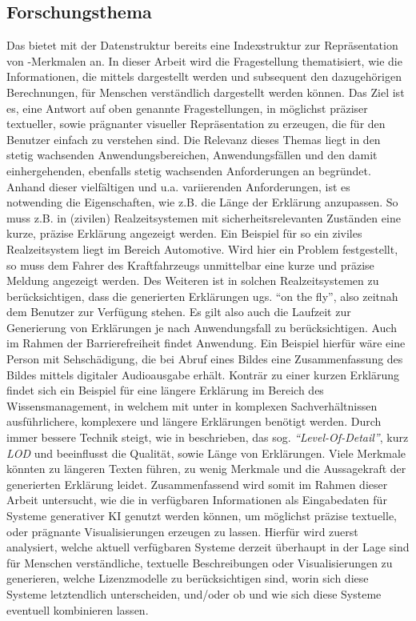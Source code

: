 \subsection{Forschungsthema}
\label{sec1:intro:subsec:res-topic}
Das \gmaf{} bietet mit der Datenstruktur \gcs{} bereits eine Indexstruktur zur Repräsentation von \mmir{}-Merkmalen an. 
In dieser Arbeit wird die Fragestellung thematisiert, wie die Informationen, die mittels \gcs{} dargestellt werden und subsequent den dazugehörigen Berechnungen, für Menschen verständlich dargestellt werden können.
Das Ziel ist es, eine Antwort auf oben genannte Fragestellungen, in möglichst präziser textueller, sowie prägnanter visueller Repräsentation zu erzeugen, die für den Benutzer einfach zu verstehen sind. 
Die Relevanz dieses Themas liegt in den stetig wachsenden Anwendungsbereichen, Anwendungsfällen und den damit einhergehenden, ebenfalls stetig wachsenden Anforderungen an \smmir{} begründet. 
Anhand dieser vielfältigen und u.a. variierenden Anforderungen, ist es notwending die Eigenschaften, wie z.B. die Länge der Erklärung anzupassen. 
So muss z.B. in (zivilen) Realzeitsystemen mit sicherheitsrelevanten Zuständen eine kurze, präzise Erklärung angezeigt werden. 
Ein Beispiel für so ein ziviles Realzeitsystem liegt im Bereich Automotive. 
Wird hier ein Problem festgestellt, so muss dem Fahrer des Kraftfahrzeugs unmittelbar eine kurze und präzise Meldung angezeigt werden.
Des Weiteren ist in solchen Realzeitsystemen zu berücksichtigen, dass die generierten Erklärungen ugs. \enquote{on the fly}, also zeitnah dem Benutzer zur Verfügung stehen.
Es gilt also auch die Laufzeit zur Generierung von Erklärungen je nach Anwendungsfall zu berücksichtigen. 
Auch im Rahmen der Barrierefreiheit findet \smmir{} Anwendung.
Ein Beispiel hierfür wäre eine Person mit Sehschädigung, die bei Abruf eines Bildes eine Zusammenfassung des Bildes mittels digitaler Audioausgabe erhält. 
Konträr zu einer kurzen Erklärung findet sich ein Beispiel für eine längere Erklärung im Bereich des Wissensmanagement, in welchem mit unter in komplexen Sachverhältnissen ausführlichere, komplexere und längere Erklärungen benötigt werden.
Durch immer bessere Technik steigt, wie in \cite{towards_auto_sem_expl_mmfg} beschrieben, das sog. \textit{\enquote{Level-Of-Detail}}, kurz \textit{LOD} und beeinflusst die Qualität, sowie Länge von Erklärungen. 
Viele Merkmale könnten zu längeren Texten führen, zu wenig Merkmale und die Aussagekraft der generierten Erklärung leidet.
\med
Zusammenfassend wird somit im Rahmen dieser Arbeit untersucht, wie die in \gcs{} verfügbaren Informationen als Eingabedaten für Systeme generativer KI genutzt werden können, um möglichst präzise textuelle, oder prägnante Visualisierungen erzeugen zu lassen.
Hierfür wird zuerst analysiert, welche aktuell verfügbaren Systeme derzeit überhaupt in der Lage sind für Menschen verständliche, textuelle Beschreibungen oder Visualisierungen zu generieren, welche Lizenzmodelle zu berücksichtigen sind, worin sich diese Systeme letztendlich unterscheiden, und/oder ob und wie sich diese Systeme eventuell kombinieren lassen.

